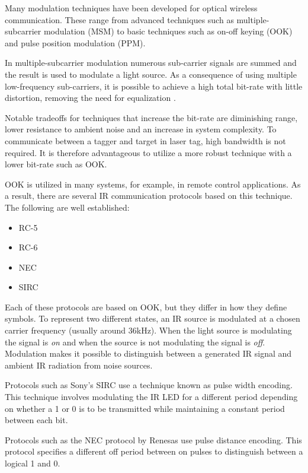 Many modulation techniques have been developed for optical wireless communication. These range from advanced techniques such as multiple-subcarrier modulation (MSM) to basic techniques such as on-off keying (OOK) and pulse position modulation (PPM).

In multiple-subcarrier modulation numerous sub-carrier signals are summed and the result is used to modulate a light source. As a consequence of using multiple low-frequency sub-carriers, it is possible to achieve a high total bit-rate with little distortion, removing the need for equalization \cite{Ohtsuki2003}.

Notable tradeoffs for techniques that increase the bit-rate are diminishing range, lower resistance to ambient noise and an increase in system complexity. To communicate between a tagger and target in laser tag, high bandwidth is not required. It is therefore advantageous to utilize a more robust technique with a lower bit-rate such as OOK.

OOK is utilized in many systems, for example, in remote control applications. As a result, there are several IR communication protocols based on this technique. The following are well established:

\begin{itemize}
	\item RC-5
	\item RC-6
	\item NEC
	\item SIRC
\end{itemize}

Each of these protocols are based on OOK, but they differ in how they define symbols. To represent two different states, an IR source is modulated at a chosen carrier frequency (usually around 36kHz). When the light source is modulating the signal is \textit{on} and when the source is not modulating the signal is \textit{off}.  Modulation makes it possible to distinguish between a generated IR signal and ambient IR radiation from noise sources.

Protocols such as Sony's SIRC use a technique known as pulse width encoding. This technique involves modulating the IR LED for a different period depending on whether a 1 or 0 is to be transmitted while maintaining a constant period between each bit.

Protocols such as the NEC protocol by Renesas use pulse distance encoding. This protocol specifies a different off period between on pulses to distinguish between a logical 1 and 0.


